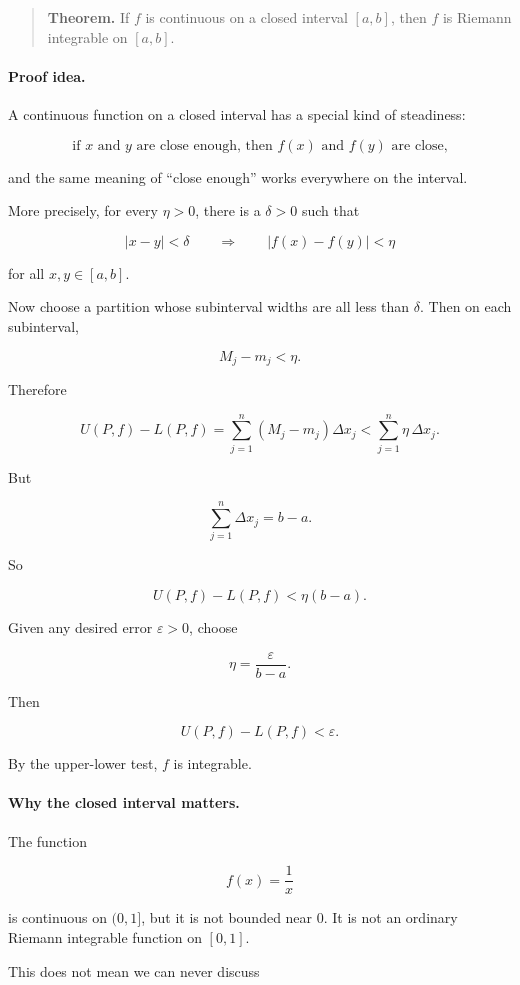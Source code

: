 \begin{quote}
\textbf{Theorem.}
If \(f\) is continuous on a closed interval \([a,b]\), then \(f\) is Riemann integrable
on \([a,b]\).
\end{quote}

\paragraph{Proof idea.}
A continuous function on a closed interval has a special kind of steadiness:

\[
\text{if }x\text{ and }y\text{ are close enough, then }f(x)\text{ and }f(y)\text{ are close,}
\]

and the same meaning of ``close enough'' works everywhere on the interval.

More precisely, for every \(\eta>0\), there is a \(\delta>0\) such that

\[
|x-y|<\delta
\qquad\Longrightarrow\qquad
|f(x)-f(y)|<\eta
\]

for all \(x,y\in[a,b]\).

Now choose a partition whose subinterval widths are all less than \(\delta\).  Then on
each subinterval,

\[
M_j-m_j<\eta.
\]

Therefore

\[
U(P,f)-L(P,f)
=
\sum_{j=1}^{n}(M_j-m_j)\Delta x_j
<
\sum_{j=1}^{n}\eta\,\Delta x_j.
\]

But

\[
\sum_{j=1}^{n}\Delta x_j=b-a.
\]

So

\[
U(P,f)-L(P,f)<\eta(b-a).
\]

Given any desired error \(\varepsilon>0\), choose

\[
\eta=\frac{\varepsilon}{b-a}.
\]

Then

\[
U(P,f)-L(P,f)<\varepsilon.
\]

By the upper-lower test, \(f\) is integrable.

\paragraph{Why the closed interval matters.}
The function

\[
f(x)=\frac1x
\]

is continuous on \((0,1]\), but it is not bounded near \(0\).  It is not an ordinary
Riemann integrable function on \([0,1]\).

This does not mean we can never discuss

